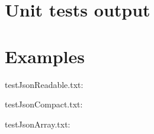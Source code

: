 \section{Unit tests output}

\begin{scriptsize}
\begin{ttfamily}

\end{ttfamily}
\end{scriptsize}

\section{Examples}

testJsonReadable.txt:\\
\begin{scriptsize}
\begin{ttfamily}

\end{ttfamily}
\end{scriptsize}

testJsonCompact.txt:\\
\begin{scriptsize}
\begin{ttfamily}

\end{ttfamily}
\end{scriptsize}

testJsonArray.txt:\\
\begin{scriptsize}
\begin{ttfamily}

\end{ttfamily}
\end{scriptsize}

